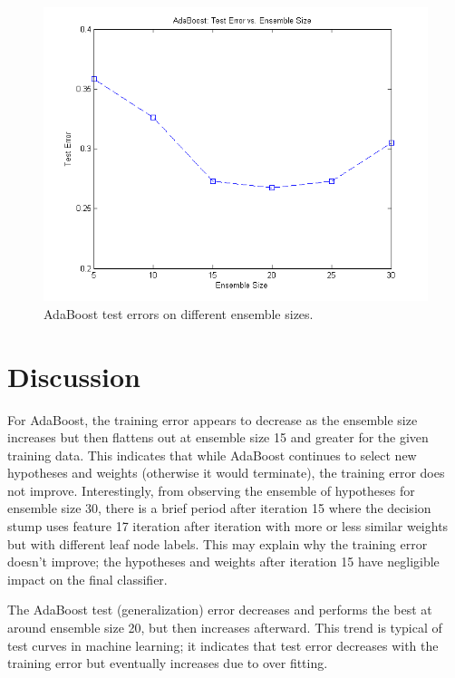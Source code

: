 \documentclass[12pt]{article}
\begin{document}
\begin{figure}[!t]
  \centering
  \includegraphics[scale=.75]{img/adaboost_testerrors.png}
  \caption{AdaBoost test errors on different ensemble sizes.}
  \label{fig:adaboost_testerrors}
\end{figure}

\section{Discussion}
For AdaBoost, the training error appears to decrease as the ensemble size increases but then flattens out at ensemble size 15 and greater for the given training data. This indicates that while AdaBoost continues to select new hypotheses and weights (otherwise it would terminate), the training error does not improve. Interestingly, from observing the ensemble of hypotheses for ensemble size 30, there is a brief period after iteration 15 where the decision stump uses feature 17 iteration after iteration with more or less similar weights but with different leaf node labels. This may explain why the training error doesn't improve; the hypotheses and weights after iteration 15 have negligible impact on the final classifier.

The AdaBoost test (generalization) error decreases and performs the best at around ensemble size 20, but then increases afterward. This trend is typical of test curves in machine learning; it indicates that test error decreases with the training error but eventually increases due to over fitting.

%
%
\end{document}
